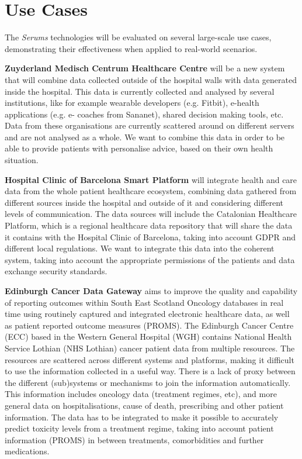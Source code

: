 \documentclass[sigconf]{acmart}
\begin{document}
\section{Use Cases}
The \emph{Serums} technologies will be evaluated on several large-scale use cases, demonstrating their effectiveness when applied to real-world scenarios.

\textbf{Zuyderland Medisch Centrum Healthcare Centre} will be a new system that will combine data collected outside of the hospital walls with data generated inside the hospital. This data is currently collected and analysed by several institutions, like for example wearable developers (e.g. Fitbit), e-health applications (e.g. e- coaches from Sananet), shared decision making tools, etc. Data from these organisations are currently scattered around on different servers and are not analysed as a whole. We want to combine this data in order to be able to provide patients with personalise advice, based on their own health situation.

\textbf{Hospital Clinic of Barcelona Smart Platform} will integrate health and care data from the whole patient healthcare ecosystem, combining data gathered from different sources inside the hospital and outside of it and considering different levels of communication. The data sources will include the Catalonian Healthcare Platform, which is a regional healthcare data repository that will share the data it contains with the Hospital Clinic of Barcelona, taking into account GDPR and different local regulations. We want to integrate this data into the coherent system, taking into account the appropriate permissions of the patients and data exchange security standards.

\textbf{Edinburgh Cancer Data Gateway} aims to improve the quality and capability of reporting outcomes within South East Scotland Oncology databases in real time using routinely captured and integrated electronic healthcare data, as well as patient reported outcome measures (PROMS). The Edinburgh Cancer Centre (ECC) based in the Western General Hospital (WGH) contains National Health Service Lothian (NHS Lothian) cancer patient data from multiple resources. The resources are scattered across different systems and platforms, making it difficult to use the information collected in a useful way. There is a lack of proxy between the different (sub)systems or mechanisms to join the information automatically. This information includes oncology data (treatment regimes, etc), and more general data on hospitalisations, cause of death, prescribing and other patient information. The data has to be integrated to make it possible to accurately predict toxicity levels from a treatment regime, taking into account patient information (PROMS) in between treatments, comorbidities and further medications.
\end{document}
